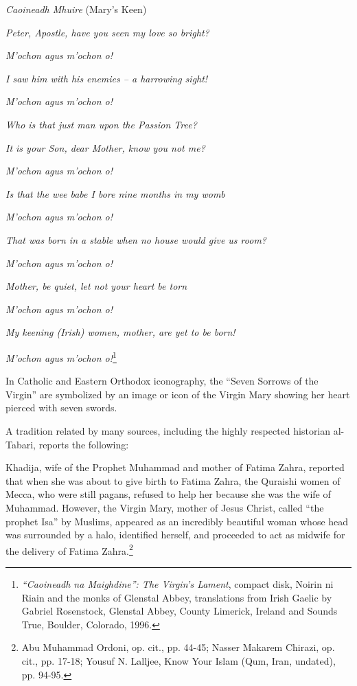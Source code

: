 \begin{quotex}
\emph{Caoineadh Mhuire} (Mary's Keen)

\emph{Peter, Apostle, have you seen my love so bright?}

\emph{M'ochon agus m'ochon o!}

\emph{I saw him with his enemies -- a harrowing sight!}

\emph{M'ochon agus m'ochon o!}

\emph{Who is that just man upon the Passion Tree?}

\emph{It is your Son, dear Mother, know you not me?}

\emph{M'ochon agus m'ochon o!}

\emph{Is that the wee babe I bore nine months in my womb}

\emph{M'ochon agus m'ochon o!}

\emph{That was born in a stable when no house would give us room?}

\emph{M'ochon agus m'ochon o!}

\emph{Mother, be quiet, let not your heart be torn}

\emph{M'ochon agus m'ochon o!}

\emph{My keening (Irish) women, mother, are yet to be born!}

\emph{M'ochon agus m'ochon o!}\footnote{\emph{``Caoineadh na Maighdine'': The Virgin's Lament}, compact disk, Noirin ni Riain and the monks of Glenstal Abbey, translations from Irish Gaelic by Gabriel Rosenstock, Glenstal Abbey, County Limerick, Ireland and Sounds True, Boulder, Colorado, 1996.
}
\end{quotex}

In Catholic and Eastern Orthodox iconography, the ``Seven Sorrows of the Virgin'' are symbolized by an image or icon of the Virgin Mary showing her heart pierced with seven swords.

A tradition related by many sources, including the highly respected historian al-Tabari, reports the following:

\begin{quotex}
Khadija, wife of the Prophet Muhammad and mother of Fatima Zahra, reported that when she was about to give birth to Fatima Zahra, the Quraishi women of Mecca, who were still pagans, refused to help her because she was the wife of Muhammad. However, the Virgin Mary, mother of Jesus Christ, called ``the prophet Isa'' by Muslims, appeared as an incredibly beautiful woman whose head was surrounded by a halo, identified herself, and proceeded to act as midwife for the delivery of Fatima Zahra.\footnote{Abu Muhammad Ordoni, op. cit., pp. 44-45; Nasser Makarem Chirazi, op. cit., pp. 17-18; Yousuf N. Lalljee, Know Your Islam (Qum, Iran, undated), pp. 94-95.}
\end{quotex}


